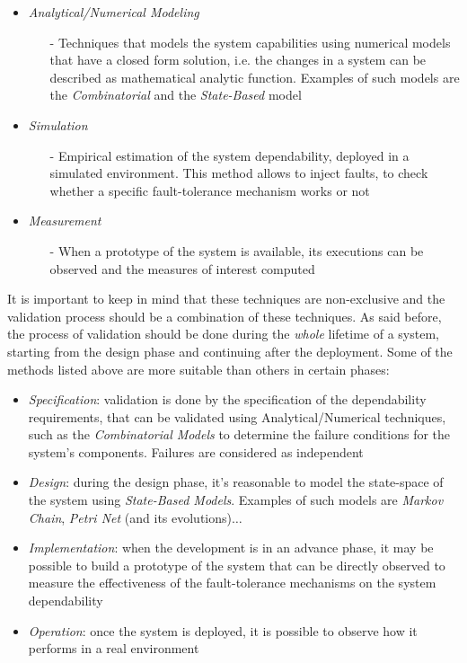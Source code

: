 \begin{itemize}
	\item \textsl{Analytical/Numerical Modeling}
	\begin{itemize}
		\item[-] Techniques that models the system capabilities using numerical models that have a closed form solution, i.e. the changes in a system can be described as mathematical analytic function. Examples of such models are the \textsl{Combinatorial} and the \textsl{State-Based} model
	\end{itemize}
	\item \textsl{Simulation}
	\begin{itemize}
		\item[-] Empirical estimation of the system dependability, deployed in a simulated environment. This method allows to inject faults, to check whether a specific fault-tolerance mechanism works or not		
	\end{itemize}
	\item \textsl{Measurement}
	\begin{itemize}
		\item[-] When a prototype of the system is available, its executions can be observed and the measures of interest computed
	\end{itemize}
\end{itemize}

It is important to keep in mind that these techniques are non-exclusive and the validation process should be a combination of these techniques. As said before, the process of validation should be done during the \textsl{whole} lifetime of a system, starting from the design phase and continuing after the deployment. Some of the methods listed above are more suitable than others in certain phases:

\begin{itemize}
	\item \textsl{Specification}: validation is done by the specification of the dependability requirements, that can be validated using Analytical/Numerical techniques, such as the \textsl{Combinatorial Models} to determine the failure conditions for the system's components. Failures are considered as independent
	\item \textsl{Design}: during the design phase, it's reasonable to model the state-space of the system using \textsl{State-Based Models}. Examples of such models are \textsl{Markov Chain}, \textsl{Petri Net} (and its evolutions)$\dots$
	\item \textsl{Implementation}: when the development is in an advance phase, it may be possible to build a prototype of the system that can be directly observed to measure the effectiveness of the fault-tolerance mechanisms on the system dependability
	\item \textsl{Operation}: once the system is deployed, it is possible to observe how it performs in a real environment
\end{itemize}

